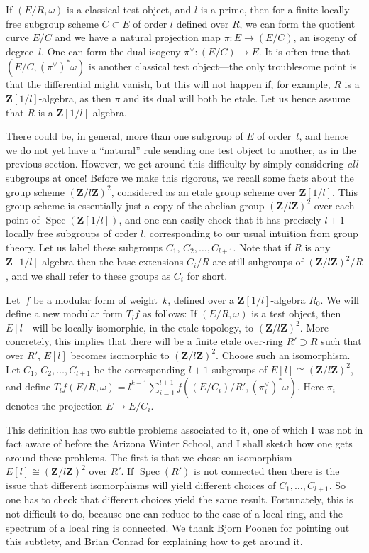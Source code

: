\documentclass{article}
\newcommand{\Z}{\mathbf{Z}}
\DeclareMathOperator{\Spec}{Spec}
\begin{document}
If $(E/R,\omega)$ is a classical test object, and $l$ is a prime,
then for a finite locally-free subgroup scheme $C\subset E$
of order $l$ defined over $R$, we can form the quotient curve $E/C$
and we have a natural projection map $\pi:E\to (E/C)$, an isogeny
of degree~$l$. One can form the dual isogeny
$\pi^\vee:(E/C)\to E$. It is often true that $(E/C,(\pi^\vee)^*\omega)$
is another classical test object---the only troublesome point is that
the differential might vanish, but this will not happen if, for example,
$R$ is a $\Z[1/l]$-algebra, as then $\pi$ and its dual will both be etale.
Let us hence assume that $R$ is a $\Z[1/l]$-algebra.

There could be, in general, more than one subgroup of $E$ of order~$l$,
and hence we do not yet have a ``natural'' rule sending one test object
to another, as in the previous
section. However, we get around this difficulty by simply considering
\emph{all} subgroups at once! Before we make this rigorous, we recall
some facts about the group scheme $(\Z/l\Z)^2$, considered as an etale
group scheme over $\Z[1/l]$. This group scheme is essentially just
a copy of the abelian group $(\Z/l\Z)^2$ over each point of $\Spec(\Z[1/l])$,
and one can easily check that it has precisely $l+1$ locally free subgroups
of order $l$, corresponding to our usual intuition from group theory.
Let us label these subgroups $C_1$, $C_2,\ldots,C_{l+1}$. Note that
if $R$ is any $\Z[1/l]$-algebra then the base extensions $C_i/R$
are still subgroups of $(\Z/l\Z)^2/R$, and we shall refer to these
groups as $C_i$ for short.

Let~$f$ be a modular form of weight~$k$, defined over
a $\Z[1/l]$-algebra $R_0$. We will define a new modular form $T_lf$ as follows:
If $(E/R,\omega)$ is a test object, then $E[l]$ will be locally isomorphic,
in the etale topology, to $(\Z/l\Z)^2$. More concretely, this implies that
there will be a finite etale over-ring $R'\supset R$ such that over
$R'$, $E[l]$ becomes isomorphic to $(\Z/l\Z)^2$.
Choose such an isomorphism. Let $C_1$, $C_2,\ldots,C_{l+1}$ be the
corresponding $l+1$ subgroups of $E[l]\cong(\Z/l\Z)^2$,
and define $T_lf(E/R,\omega)=
l^{k-1}\sum_{i=1}^{l+1}f((E/C_i)/R',(\pi_i^\vee)^*\omega)$.
Here $\pi_i$ denotes the projection $E\to E/C_i$.

This definition has two subtle problems associated
to it, one of which I was not in fact aware of before the Arizona
Winter School, and I shall sketch how one gets around these problems. The first
is that we chose an isomorphism $E[l]\cong(\Z/l\Z)^2$ over $R'$. If $\Spec(R')$
is not connected then there is the issue that different isomorphisms
will yield different choices of $C_1,\ldots,C_{l+1}$. So one has to check
that different choices yield the same result. Fortunately, this is not
difficult to do, because one can reduce to the case of a local ring, and the
spectrum of a local ring is connected. We thank Bjorn Poonen for pointing
out this subtlety, and Brian Conrad for explaining how to get around it.
\end{document}
